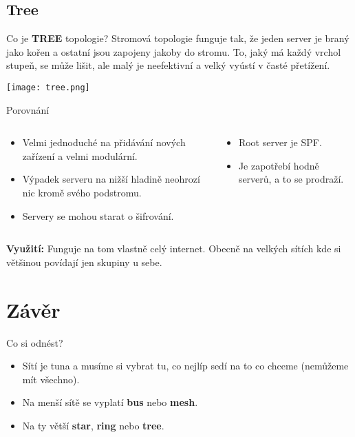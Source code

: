 \documentclass{beamer}
\begin{document}
\subsection{Tree}
\label{sec:tree}

\begin{frame}{Co je \textbf{TREE} topologie?}
    Stromová topologie funguje tak, že jeden server je braný jako kořen a
    ostatní jsou zapojeny jakoby do stromu. To, jaký má každý vrchol stupeň, se
    může lišit, ale malý je neefektivní a velký vyústí v časté přetížení.

    \texttt{[image: tree.png]}
\end{frame}

\begin{frame}{Porovnání}

\begin{columns}
    \begin{column}{0.45\textwidth}
        \begin{itemize}
         \item Velmi jednoduché na přidávání nových zařízení a velmi modulární.
         \item Výpadek serveru na nižší hladině neohrozí nic kromě svého
             podstromu.
         \item Servery se mohou starat o šifrování.

        \end{itemize}
    \end{column}
    \begin{column}{0.45\textwidth}  %
        \begin{itemize}
            \item Root server je SPF.
            \item Je zapotřebí hodně serverů, a to se prodraží.
        \end{itemize}
    \end{column}
    \end{columns}
    \vspace{10pt}

\textbf{Využití:} Funguje na tom vlastně celý internet. Obecně na velkých sítích kde si většinou povídají jen skupiny u
sebe.

\end{frame}

\section{Závěr}
\label{sec:zaver}

\begin{frame}{Co si odnést?}
 \begin{itemize}
  \item Sítí je tuna a musíme si vybrat tu, co nejlíp sedí na to co chceme
      (nemůžeme mít všechno).
  \item Na menší sítě se vyplatí \textbf{bus} nebo \textbf{mesh}.
  \item Na ty větší \textbf{star}, \textbf{ring} nebo \textbf{tree}.
 \end{itemize}
 
\end{frame}
\end{document}
